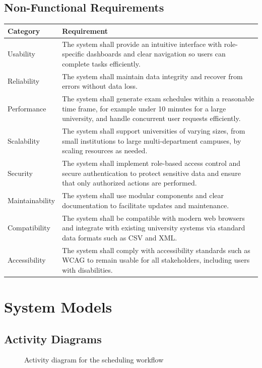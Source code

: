 \documentclass[11pt]{report}
\newcommand{\diagramfigure}[3]{%
\begin{figure}[H]
\centering

\caption{#2}
\end{figure}
}
\begin{document}
\section{Non-Functional Requirements}
\begin{longtable}{p{}p{}}
\toprule
\textbf{Category} & \textbf{Requirement} \\
\midrule
Usability & The system shall provide an intuitive interface with role-specific dashboards and clear navigation so users can complete tasks efficiently. \\
Reliability & The system shall maintain data integrity and recover from errors without data loss. \\
Performance & The system shall generate exam schedules within a reasonable time frame, for example under 10 minutes for a large university, and handle concurrent user requests efficiently. \\
Scalability & The system shall support universities of varying sizes, from small institutions to large multi-department campuses, by scaling resources as needed. \\
Security & The system shall implement role-based access control and secure authentication to protect sensitive data and ensure that only authorized actions are performed. \\
Maintainability & The system shall use modular components and clear documentation to facilitate updates and maintenance. \\
Compatibility & The system shall be compatible with modern web browsers and integrate with existing university systems via standard data formats such as CSV and XML. \\
Accessibility & The system shall comply with accessibility standards such as WCAG to remain usable for all stakeholders, including users with disabilities. \\
\bottomrule
\end{longtable}

\chapter{System Models}

\section{Activity Diagrams}
\diagramfigure{02_activity_diagram_workflow}{Activity diagram for the scheduling workflow}{0.95}
\end{document}

